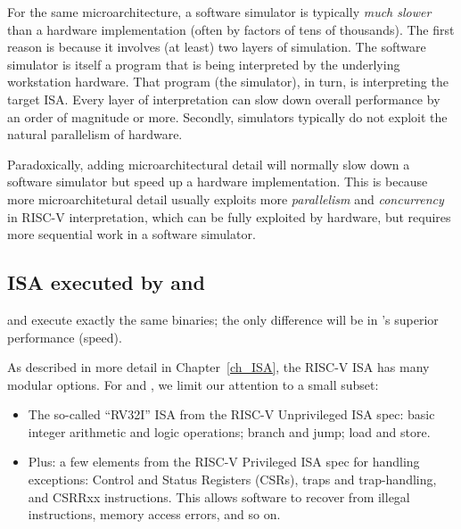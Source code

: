 For the same microarchitecture, a software simulator is typically
\emph{much slower} than a hardware implementation (often by factors of
tens of thousands).  The first reason is because it involves (at
least) two layers of simulation. The software simulator is itself a
program that is being interpreted by the underlying workstation
hardware.  That program (the simulator), in turn, is interpreting the
target ISA.  Every layer of interpretation can slow down overall
performance by an order of magnitude or more.  Secondly, simulators
typically do not exploit the natural parallelism of hardware.

Paradoxically, adding microarchitectural detail will normally slow
down a software simulator but speed up a hardware implementation.
This is because more microarchitetural detail usually exploits more
\emph{parallelism} and \emph{concurrency} in RISC-V interpretation,
which can be fully exploited by hardware, but requires more sequential
work in a software simulator.


\subsection{ISA executed by {\DRUM} and {\FIFE}}

{\DRUM} and {\FIFE} execute exactly the same binaries; the only difference
will be in {\FIFE}'s superior performance (speed).

As described in more detail in Chapter~\ref{ch_ISA}, the RISC-V ISA
has many modular options.  For {\DRUM} and {\FIFE}, we limit our attention
to a small subset:

\begin{itemize}
		  
 \item The so-called ``RV32I'' ISA from the RISC-V Unprivileged ISA
       spec: basic integer arithmetic and logic operations; branch and
       jump; load and store.

 \item Plus: a few elements from the RISC-V Privileged ISA spec for
       handling exceptions: Control and Status Registers (CSRs), traps
       and trap-handling, and CSRRxx instructions.  This allows
       software to recover from illegal instructions, memory access
       errors, and so on.

\end{itemize}

